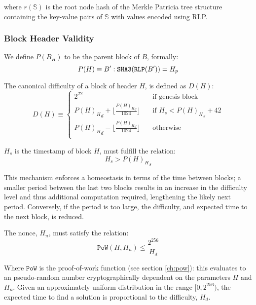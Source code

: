 \documentclass[9pt,oneside]{amsart}
\begin{document}
\begin{multicols}{2}
where $r(\mathbb{S})$ is the root node hash of the Merkle Patricia tree structure containing the key-value pairs of $\mathbb{S}$ with values encoded using RLP.

\subsubsection{Block Header Validity}

We define $P(B_H)$ to be the parent block of $B$, formally:
\begin{equation}
P(H) \equiv B': \mathtt{\tiny SHA3}(\mathtt{\tiny RLP}(B')) = H_p
\end{equation}

The canonical difficulty of a block of header $H$, is defined as $D(H)$:
\begin{equation}
D(H) \equiv \begin{cases}
2^{22} & \quad \text{if genesis block}\\
{P(H)_H}_d + \lfloor\frac{{P(H)_H}_d}{1024}\rfloor & \quad \text{if $H_s < {P(H)_H}_s + 42$}\\
{P(H)_H}_d - \lfloor\frac{{P(H)_H}_d}{1024}\rfloor & \quad \text{otherwise}\\
\end{cases}
\end{equation}

$H_s$ is the timestamp of block $H$, must fulfill the relation:
\begin{equation}
H_s > {P(H)_H}_s
\end{equation}

This mechanism enforces a homeostasis in terms of the time between blocks; a smaller period between the last two blocks results in an increase in the difficulty level and thus additional computation required, lengthening the likely next period. Conversely, if the period is too large, the difficulty, and expected time to the next block, is reduced.

The nonce, $H_n$, must satisfy the relation:
\begin{equation}
\mathtt{PoW}(H, H_n) \leqslant \frac{2^{256}}{H_d}
\end{equation}

Where $\mathtt{PoW}$ is the proof-of-work function (see section \ref{ch:pow}): this evaluates to an pseudo-random number cryptographically dependent on the parameters $H$ and $H_n$. Given an approximately uniform distribution in the range $[0, 2^{256})$, the expected time to find a solution is proportional to the difficulty, $H_d$.


\end{multicols}
\end{document}
